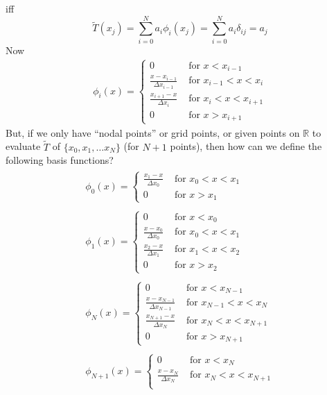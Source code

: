 \documentclass[10pt]{amsart}
\begin{document}
\begin{multicols*}{2}
iff
\[
\widetilde{T}(x_j) = \sum_{i=0}^N a_i\phi_i(x_j) = \sum_{i=0}^N a_i \delta_{ij} = a_j
\]
Now
\[
\begin{gathered}
  \phi_i(x) = \begin{cases} 0 & \text{ for } x < x_{i-1} \\
    \frac{x-x_{i-1} }{ \Delta x_{i-1} } & \text{ for } x_{i-1} < x < x_i \\
    \frac{ x_{i+1} - x}{\Delta x_i} & \text{ for } x_i < x < x_{i+1} \\
    0 & \text{ for } x > x_{i+1}
    \end{cases}  
  \end{gathered}
\]
But, if we only have ``nodal points'' or grid points, or given points on $\mathbb{R}$ to evaluate $\widetilde{T}$ of $\lbrace x_0, x_1, \dots x_N \rbrace$ (for $N+1$ points), then how can we define the following basis functions?
\[
\begin{gathered}
\begin{gathered}
  \phi_0(x) = \begin{cases} 
    \frac{ x_{1} - x}{\Delta x_0} & \text{ for } x_0 < x < x_{1} \\
    0 & \text{ for } x > x_{1}
    \end{cases}  
  \end{gathered} \\
\begin{gathered}
  \phi_1(x) = \begin{cases} 0 & \text{ for } x < x_{0} \\
    \frac{x-x_{0} }{ \Delta x_{0} } & \text{ for } x_{0} < x < x_1 \\
    \frac{ x_{2} - x}{\Delta x_1} & \text{ for } x_1 < x < x_{2} \\
    0 & \text{ for } x > x_{2}
    \end{cases}  
  \end{gathered} \\
\begin{gathered}
  \phi_N(x) = \begin{cases} 0 & \text{ for } x < x_{N-1} \\
    \frac{x-x_{N-1} }{ \Delta x_{N-1} } & \text{ for } x_{N-1} < x < x_N \\
    \frac{ x_{N+1} - x}{\Delta x_N} & \text{ for } x_N < x < x_{N+1} \\
    0 & \text{ for } x > x_{N+1}
    \end{cases}  
\end{gathered} \\
\begin{gathered}
  \phi_{N+1}(x) = \begin{cases} 0 & \text{ for } x < x_{N} \\
    \frac{x-x_{N} }{ \Delta x_{N} } & \text{ for } x_{N} < x < x_{N+1} \\
    \end{cases}  
  \end{gathered}
  \end{gathered}
  \]
  

\end{multicols*}
\end{document}
